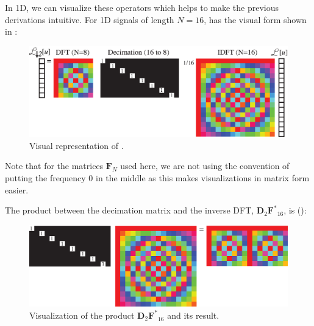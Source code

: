 In 1D, we can visualize these operators which helps to make the previous derivations intuitive. For 1D signals of length $N=16$, \eqn{\ref{eq:matrixformsubsampling}} has the visual form shown in \fig{\ref{fig:aliasing_in_matrix_form}}:
\begin{figure}[h!]
\centerline{
\includegraphics[width=.9\linewidth]{figures/upsamplig_downsampling/aliasing_in_matrix_form.eps}
}
\caption{Visual representation of \eqn{\ref{eq:matrixformsubsampling}}.}
\label{fig:aliasing_in_matrix_form}
\end{figure}

Note that for the matrices $\mathbf{F}_{N}$ used here, we are not using the convention of putting the frequency 0 in the middle as this makes visualizations in matrix form easier. 

The product between the decimation matrix and the inverse DFT, $\mathbf{D}_2 \mathbf{F^*}_{16}$, is (\fig{\ref{fig:decimationFT_inmatrixform}}):
\begin{figure}[h!]
\centerline{
\includegraphics[width=.9\linewidth]{figures/upsamplig_downsampling/decimationFT_inmatrixform.eps}
}
\caption{Visualization of the product $\mathbf{D}_2 \mathbf{F^*}_{16}$ and its result.}
\label{fig:decimationFT_inmatrixform}
\end{figure}

